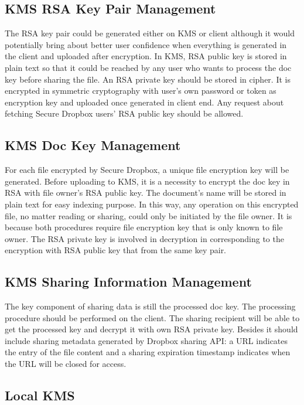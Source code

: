 \subsection{KMS RSA Key Pair Management}

The RSA key pair could be generated either on KMS or client although it would potentially bring about better user confidence when everything is generated in the client and uploaded after encryption. In KMS, RSA public key is stored in plain text so that it could be reached by any user who wants to process the doc key before sharing the file. An RSA private key should be stored in cipher. It is encrypted in symmetric cryptography with user’s own password or token as encryption key and uploaded once generated in client end. Any request about fetching Secure Dropbox users’ RSA public key should be allowed.

\subsection{KMS Doc Key Management}

For each file encrypted by Secure Dropbox, a unique file encryption key will be generated. Before uploading to KMS, it is a necessity to encrypt the doc key in RSA with file owner’s RSA public key. The document’s name will be stored in plain text for easy indexing purpose. In this way, any operation on this encrypted file, no matter reading or sharing, could only be initiated by the file owner. It is because both procedures require file encryption key that is only known to file owner. The RSA private key is involved in decryption in corresponding to the encryption with RSA public key that from the same key pair.

\subsection{KMS Sharing Information Management}

The key component of sharing data is still the processed doc key. The processing procedure should be performed on the client. The sharing recipient will be able to get the processed key and decrypt it with own RSA private key. Besides it should include sharing metadata generated by Dropbox sharing API: a URL indicates the entry of the file content and a sharing expiration timestamp indicates when the URL will be closed for access.

\subsection{Local KMS}

